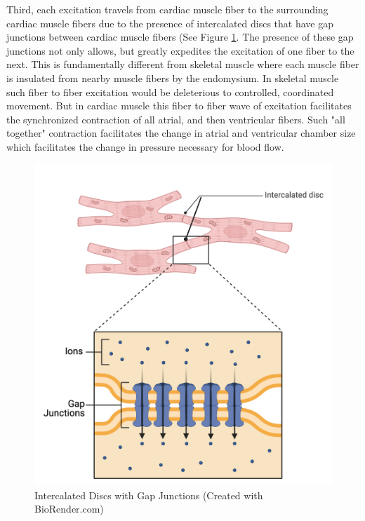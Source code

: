 Third, each excitation travels from cardiac muscle fiber to the surrounding cardiac muscle fibers due to the presence of intercalated discs that have gap junctions between cardiac muscle fibers (See Figure \ref{fig:Cardiac_Gap_Junctions}. The presence of these gap junctions not only allows, but greatly expedites the excitation of one fiber to the next. This is fundamentally different from skeletal muscle where each muscle fiber is insulated from nearby muscle fibers by the endomysium. In skeletal muscle such fiber to fiber excitation would be deleterious to controlled, coordinated movement. But in cardiac muscle this fiber to fiber wave of excitation facilitates the synchronized contraction of all atrial, and then ventricular fibers. Such "all together" contraction facilitates the change in atrial and ventricular chamber size which facilitates the change in pressure necessary for blood flow.

\begin{figure}[!h]
    \centering
    \includegraphics[width=1\linewidth]{./figure/Cardiac_Gap_Junctions.png}
    \caption{Intercalated Discs with Gap Junctions \footnotesize{(Created with BioRender.com)}}
    \label{fig:Cardiac_Gap_Junctions}
\end{figure}

